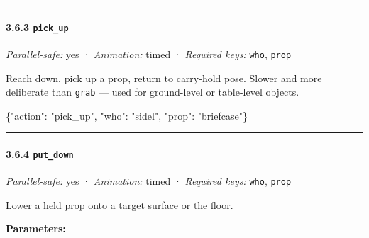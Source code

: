 \documentclass[
  11pt,
]{book}
\newenvironment{Shaded}{}{}
\newcommand{\DataTypeTok}[1]{\textcolor[rgb]{0.56,0.13,0.00}{#1}}
\newcommand{\FunctionTok}[1]{\textcolor[rgb]{0.02,0.16,0.49}{#1}}
\newcommand{\StringTok}[1]{\textcolor[rgb]{0.25,0.44,0.63}{#1}}
\begin{document}
\begin{center}\rule{0.5\linewidth}{0.5pt}\end{center}

\paragraph{\texorpdfstring{3.6.3
\texttt{pick\_up}}{3.6.3 pick\_up}}\label{pick_up}

\emph{Parallel-safe:} yes · \emph{Animation:} timed · \emph{Required
keys:} \texttt{who}, \texttt{prop}

Reach down, pick up a prop, return to carry-hold pose. Slower and more
deliberate than \texttt{grab} --- used for ground-level or table-level
objects.

\begin{Shaded}
\begin{Highlighting}[]
\FunctionTok{\{}\DataTypeTok{"action"}\FunctionTok{:} \StringTok{"pick\_up"}\FunctionTok{,} \DataTypeTok{"who"}\FunctionTok{:} \StringTok{"sidel"}\FunctionTok{,} \DataTypeTok{"prop"}\FunctionTok{:} \StringTok{"briefcase"}\FunctionTok{\}}
\end{Highlighting}
\end{Shaded}

\begin{center}\rule{0.5\linewidth}{0.5pt}\end{center}

\paragraph{\texorpdfstring{3.6.4
\texttt{put\_down}}{3.6.4 put\_down}}\label{put_down}

\emph{Parallel-safe:} yes · \emph{Animation:} timed · \emph{Required
keys:} \texttt{who}, \texttt{prop}

Lower a held prop onto a target surface or the floor.

\textbf{Parameters:}
\end{document}
